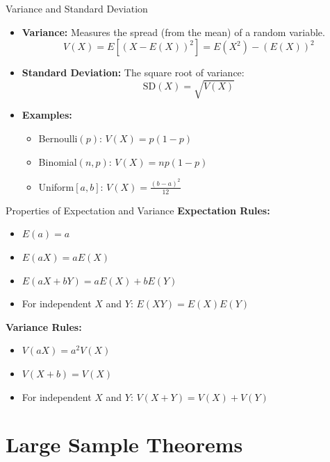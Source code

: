 \documentclass[aspectratio=169]{beamer}
\begin{document}
\begin{frame}{Variance and Standard Deviation}
    \begin{itemize}
        \item \textbf{Variance:} Measures the spread (from the mean) of a random variable.
        \[
        V(X) = E[(X - E(X))^2] = E(X^2) - (E(X))^2
        \]
        \item \textbf{Standard Deviation:} The square root of variance:
        \[
        \text{SD}(X) = \sqrt{V(X)}
        \]
        \item \textbf{Examples:}
        \begin{itemize}
            \item[$\bullet$] Bernoulli$(p)$: \(V(X) = p(1-p)\)
            \item[$\bullet$] Binomial$(n, p)$: \(V(X) = np(1-p)\)
            \item[$\bullet$] Uniform$[a, b]$: \(V(X) = \frac{(b-a)^2}{12}\)
        \end{itemize}
    \end{itemize}
\end{frame}

\begin{frame}{Properties of Expectation and Variance}
    \textbf{Expectation Rules:}
    \begin{itemize}
        \item \(E(a) = a\)
        \item \(E(aX) = aE(X)\)
        \item \(E(aX + bY) = aE(X) + bE(Y)\)
        \item For independent \(X\) and \(Y\): \(E(XY) = E(X)E(Y)\)
    \end{itemize}
    \vspace{0.5cm}
    \textbf{Variance Rules:}
    \begin{itemize}
        \item \(V(aX) = a^2V(X)\)
        \item \(V(X + b) = V(X)\)
        \item For independent \(X\) and \(Y\): \(V(X + Y) = V(X) + V(Y)\)
    \end{itemize}
\end{frame}

\section{\large Large Sample Theorems}
\end{document}
